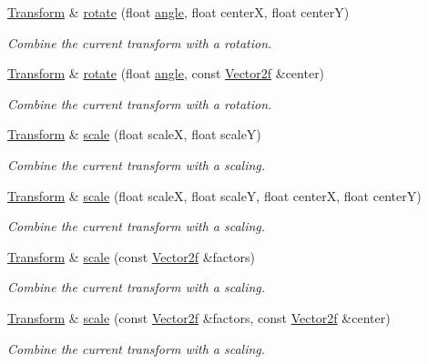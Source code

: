 \begin{DoxyCompactItemize}
\hyperlink{classsf_1_1_transform}{Transform} \& \hyperlink{classsf_1_1_transform_af0b7cc3fed36d0fa22d5d331a779eee2}{rotate} (float \hyperlink{_vector3_8h_abd17f37dc7bb5b2bd9a569193ebcdda4}{angle}, float center\-X, float center\-Y)
\begin{DoxyCompactList}\small\item\em Combine the current transform with a rotation. \end{DoxyCompactList}\item 
\hyperlink{classsf_1_1_transform}{Transform} \& \hyperlink{classsf_1_1_transform_ad2a2520ad81724079d109d4a986f9902}{rotate} (float \hyperlink{_vector3_8h_abd17f37dc7bb5b2bd9a569193ebcdda4}{angle}, const \hyperlink{namespacesf_acf03098c2577b869e2fa6836cc48f1a0}{Vector2f} \&center)
\begin{DoxyCompactList}\small\item\em Combine the current transform with a rotation. \end{DoxyCompactList}\item 
\hyperlink{classsf_1_1_transform}{Transform} \& \hyperlink{classsf_1_1_transform_a3f46af807f69d74120fb836334268671}{scale} (float scale\-X, float scale\-Y)
\begin{DoxyCompactList}\small\item\em Combine the current transform with a scaling. \end{DoxyCompactList}\item 
\hyperlink{classsf_1_1_transform}{Transform} \& \hyperlink{classsf_1_1_transform_a6eaeedd35e289cb17f9bf7f24dc28daa}{scale} (float scale\-X, float scale\-Y, float center\-X, float center\-Y)
\begin{DoxyCompactList}\small\item\em Combine the current transform with a scaling. \end{DoxyCompactList}\item 
\hyperlink{classsf_1_1_transform}{Transform} \& \hyperlink{classsf_1_1_transform_a3d57622a7ab309925c9d9887c99cc720}{scale} (const \hyperlink{namespacesf_acf03098c2577b869e2fa6836cc48f1a0}{Vector2f} \&factors)
\begin{DoxyCompactList}\small\item\em Combine the current transform with a scaling. \end{DoxyCompactList}\item 
\hyperlink{classsf_1_1_transform}{Transform} \& \hyperlink{classsf_1_1_transform_a9198da375173127901f3095e0165ee1b}{scale} (const \hyperlink{namespacesf_acf03098c2577b869e2fa6836cc48f1a0}{Vector2f} \&factors, const \hyperlink{namespacesf_acf03098c2577b869e2fa6836cc48f1a0}{Vector2f} \&center)
\begin{DoxyCompactList}\small\item\em Combine the current transform with a scaling. \end{DoxyCompactList}\end{DoxyCompactItemize}
